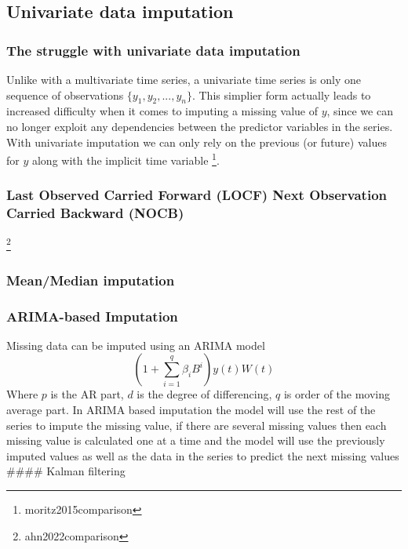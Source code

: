\documentclass[
]{report}
\begin{document}

\subsection{Univariate data
imputation}\label{univariate-data-imputation}

\subsubsection{The struggle with univariate data
imputation}\label{the-struggle-with-univariate-data-imputation}

Unlike with a multivariate time series, a univariate time series is only
one sequence of observations \(\{y_1, y_2, ..., y_n\}\). This simplier
form actually leads to increased difficulty when it comes to imputing a
missing value of \(y\), since we can no longer exploit any dependencies
between the predictor variables in the series. With univariate
imputation we can only rely on the previous (or future) values for \(y\)
along with the implicit time variable \footnote{moritz2015comparison}.

\subsubsection{Last Observed Carried Forward (LOCF) Next Observation
Carried Backward
(NOCB)}\label{last-observed-carried-forward-locf-next-observation-carried-backward-nocb}

\footnote{ahn2022comparison}

\subsubsection{Mean/Median imputation}\label{meanmedian-imputation}

\subsubsection{ARIMA-based Imputation}\label{arima-based-imputation}

Missing data can be imputed using an ARIMA model
\[\left(1+ \sum_{i=1}^q \beta_i B^i\right)y(t)W(t)\] Where \(p\) is the
AR part, \(d\) is the degree of differencing, \(q\) is order of the
moving average part. In ARIMA based imputation the model will use the
rest of the series to impute the missing value, if there are several
missing values then each missing value is calculated one at a time and
the model will use the previously imputed values as well as the data in
the series to predict the next missing values \#\#\#\# Kalman filtering
\end{document}
